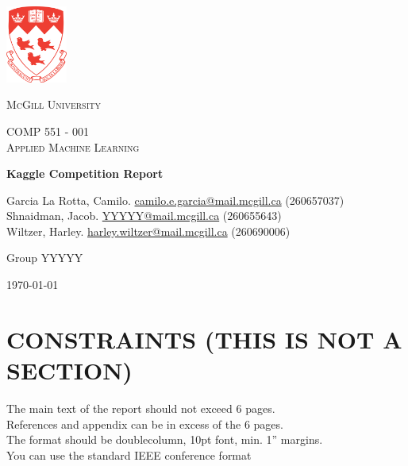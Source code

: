 \documentclass[10pt, hidelinks]{article}
\begin{document}

\begin{titlepage}
    \begin{center}
        \includegraphics[width=0.15\textwidth]{McGillLogo.png}~\par\vspace{1cm}
        {\scshape\LARGE McGill University \par}
        \vspace{1cm}
        {\scshape\Large COMP 551 - 001 \\ Applied Machine Learning\par}
        \vspace{1.5cm}
        {\huge\bfseries Kaggle Competition Report\par}
        \vspace{2cm}
        {\Large Garcia La Rotta, Camilo. \href{mailto:camilo.e.garcia@mail.mcgill.ca}{camilo.e.garcia@mail.mcgill.ca} (260657037)}\\
        {\Large Shnaidman, Jacob. \href{mailto:jacob.shnaidman@mail.mcgill.ca}{YYYYY@mail.mcgill.ca} (260655643)}\\
        {\Large Wiltzer, Harley. \href{mailto:harley.wiltzer@mail.mcgill.ca}{harley.wiltzer@mail.mcgill.ca} (260690006)}
        \vfill
        {\large Group YYYYY\par}
        \vfill
        {\large \today\par}
    \end{center}
\end{titlepage}

\newpage

\section*{CONSTRAINTS (THIS IS NOT A SECTION)}
The main text of the report should not exceed 6 pages.\\
References and appendix can be in excess of the 6 pages.\\   
The format should be doublecolumn, 10pt font, min. 1” margins.\\  
You can use the standard IEEE conference format
\end{document}
